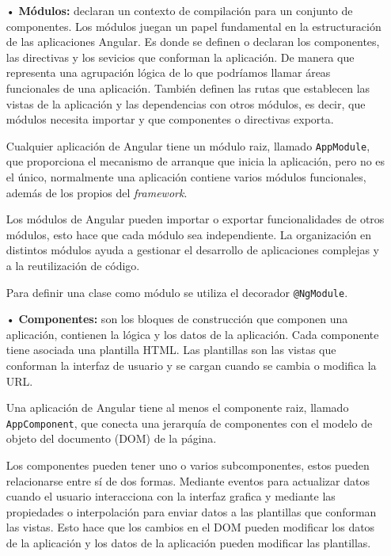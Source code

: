 \documentclass[a4paper, 12pt]{book}
\begin{document}
\begin{itemize}

	\item[•] \textbf{Módulos:} declaran un contexto de compilación para un conjunto de componentes. 
	Los módulos juegan un papel fundamental en la estructuración de las aplicaciones Angular. 
	Es donde se definen o declaran los componentes, las directivas y los sevicios que conforman la aplicación. 
	De manera que representa una agrupación lógica de lo que podríamos llamar áreas funcionales de una aplicación. 
	También definen las rutas que establecen las vistas de la aplicación y las dependencias con otros módulos, es decir, que módulos necesita importar y que componentes o directivas exporta. 
	
	Cualquier aplicación de Angular tiene un módulo raiz, llamado \texttt{AppModule}, que proporciona el mecanismo de arranque que inicia la aplicación, pero no es el único, normalmente una aplicación contiene varios módulos funcionales, además de los propios del \emph{framework}. 
	
	Los módulos de Angular pueden importar o exportar funcionalidades de otros módulos, esto hace que cada módulo sea independiente. 
	La organización en distintos módulos ayuda a gestionar el desarrollo de aplicaciones complejas y a la reutilización de código.
	
	Para definir una clase como módulo se utiliza el decorador \texttt{@NgModule}.
	
	\item[•] \textbf{Componentes:} son los bloques de construcción que componen una aplicación, contienen la lógica y los datos de la aplicación. 
	Cada componente tiene asociada una plantilla HTML. Las plantillas son las vistas que conforman la interfaz de usuario y se cargan cuando se cambia o modifica la URL.
	
	Una aplicación de Angular tiene al menos el componente raiz, llamado \texttt{AppComponent}, que conecta una jerarquía de componentes con el modelo de objeto del documento (DOM) de la página.
	
	Los componentes pueden tener uno o varios subcomponentes, estos pueden relacionarse entre sí de dos formas. 
	Mediante eventos para actualizar datos cuando el usuario interacciona con la interfaz grafica y mediante las propiedades o interpolación para enviar datos a las plantillas que conforman las vistas. 
	Esto hace que los cambios en el DOM pueden modificar los datos de la aplicación y los datos de la aplicación pueden modificar las plantillas.
	

\end{itemize}
\end{document}
